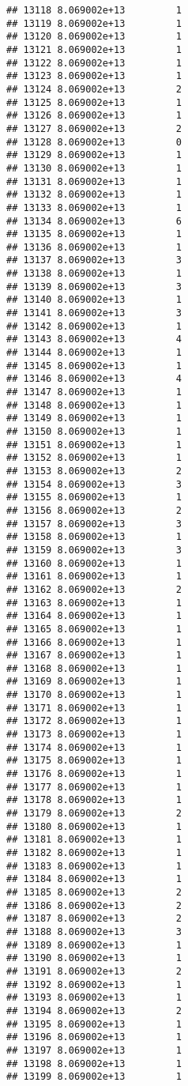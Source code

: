 \documentclass[
]{article}
\begin{document}
\begin{verbatim}
## 13118 8.069002e+13         1
## 13119 8.069002e+13         1
## 13120 8.069002e+13         1
## 13121 8.069002e+13         1
## 13122 8.069002e+13         1
## 13123 8.069002e+13         1
## 13124 8.069002e+13         2
## 13125 8.069002e+13         1
## 13126 8.069002e+13         1
## 13127 8.069002e+13         2
## 13128 8.069002e+13         0
## 13129 8.069002e+13         1
## 13130 8.069002e+13         1
## 13131 8.069002e+13         1
## 13132 8.069002e+13         1
## 13133 8.069002e+13         1
## 13134 8.069002e+13         6
## 13135 8.069002e+13         1
## 13136 8.069002e+13         1
## 13137 8.069002e+13         3
## 13138 8.069002e+13         1
## 13139 8.069002e+13         3
## 13140 8.069002e+13         1
## 13141 8.069002e+13         3
## 13142 8.069002e+13         1
## 13143 8.069002e+13         4
## 13144 8.069002e+13         1
## 13145 8.069002e+13         1
## 13146 8.069002e+13         4
## 13147 8.069002e+13         1
## 13148 8.069002e+13         1
## 13149 8.069002e+13         1
## 13150 8.069002e+13         1
## 13151 8.069002e+13         1
## 13152 8.069002e+13         1
## 13153 8.069002e+13         2
## 13154 8.069002e+13         3
## 13155 8.069002e+13         1
## 13156 8.069002e+13         2
## 13157 8.069002e+13         3
## 13158 8.069002e+13         1
## 13159 8.069002e+13         3
## 13160 8.069002e+13         1
## 13161 8.069002e+13         1
## 13162 8.069002e+13         2
## 13163 8.069002e+13         1
## 13164 8.069002e+13         1
## 13165 8.069002e+13         1
## 13166 8.069002e+13         1
## 13167 8.069002e+13         1
## 13168 8.069002e+13         1
## 13169 8.069002e+13         1
## 13170 8.069002e+13         1
## 13171 8.069002e+13         1
## 13172 8.069002e+13         1
## 13173 8.069002e+13         1
## 13174 8.069002e+13         1
## 13175 8.069002e+13         1
## 13176 8.069002e+13         1
## 13177 8.069002e+13         1
## 13178 8.069002e+13         1
## 13179 8.069002e+13         2
## 13180 8.069002e+13         1
## 13181 8.069002e+13         1
## 13182 8.069002e+13         1
## 13183 8.069002e+13         1
## 13184 8.069002e+13         1
## 13185 8.069002e+13         2
## 13186 8.069002e+13         2
## 13187 8.069002e+13         2
## 13188 8.069002e+13         3
## 13189 8.069002e+13         1
## 13190 8.069002e+13         1
## 13191 8.069002e+13         2
## 13192 8.069002e+13         1
## 13193 8.069002e+13         1
## 13194 8.069002e+13         2
## 13195 8.069002e+13         1
## 13196 8.069002e+13         1
## 13197 8.069002e+13         1
## 13198 8.069002e+13         1
## 13199 8.069002e+13         1

\end{verbatim}
\end{document}

